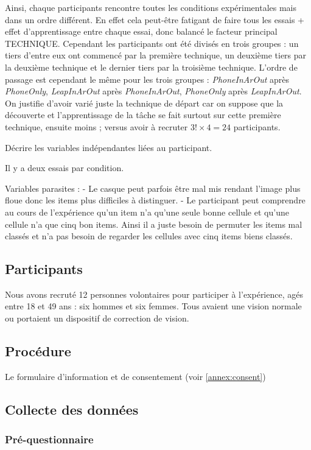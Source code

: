 Ainsi, chaque participants rencontre toutes les conditions expérimentales mais dans un ordre différent. En effet cela peut-être fatigant de faire tous les essais + effet d'apprentissage entre chaque essai, donc balancé le facteur principal \textsc{TECHNIQUE}. Cependant les participants ont été divisés en trois groupes : un tiers d'entre eux ont commencé par la première technique, un deuxième tiers par la deuxième technique et le dernier tiers par la troisième technique. L'ordre de passage est cependant le même pour les trois groupes : \textit{PhoneInArOut} après \textit{PhoneOnly}, \textit{LeapInArOut} après \textit{PhoneInArOut}, \textit{PhoneOnly} après \textit{LeapInArOut}. On justifie d'avoir varié juste la technique de départ car on suppose que la découverte et l'apprentissage de la tâche se fait surtout sur cette première technique, ensuite moins ; versus avoir à recruter $3! \times 4 = 24$ participants.

Décrire les variables indépendantes liées au participant.

Il y a deux essais par condition.

Variables parasites : 
- Le casque peut parfois être mal mis rendant l'image plus floue donc les items plus difficiles à distinguer.
- Le participant peut comprendre au cours de l'expérience qu'un item n'a qu'une seule bonne cellule et qu'une cellule n'a que cinq bon items. Ainsi il a juste besoin de permuter les items mal classés et n'a pas besoin de regarder les cellules avec cinq items biens classés.

\subsection{Participants}
Nous avons recruté 12 personnes volontaires pour participer à l'expérience, agés entre 18 et 49 ans : six hommes et six femmes. Tous avaient une vision normale ou portaient un dispositif de correction de vision.

\subsection{Procédure}
Le formulaire d'information et de consentement (voir \autoref{annex:consent})

\subsection{Collecte des données}
\subsubsection{Pré-questionnaire}

